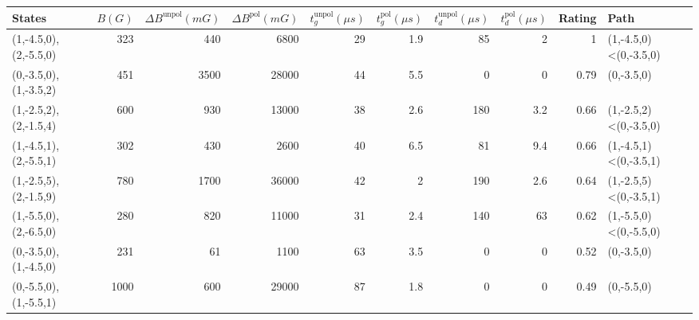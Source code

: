 \begin{tabular}{lrrrrrrrrl}
\hline
 {States}              &   {$B(G)$} &   {$\Delta B^{\text{unpol}}(mG)$} &   {$\Delta B^{\text{pol}}(mG)$} &   {$t^{\text{unpol}}_{g}(\mu s)$} &   {$t^{\text{pol}}_{g}(\mu s)$} &   {$t^{\text{unpol}}_{d}(\mu s)$} &   {$t^{\text{pol}}_{d}(\mu s)$} &   {Rating} & {Path}                \\
\hline
 (1,-4.5,0),(2,-5.5,0) &        323 &                               440 &                            6800 &                                29 &                             1.9 &                                85 &                             2   &       1    & (1,-4.5,0)<(0,-3.5,0) \\
 (0,-3.5,0),(1,-3.5,2) &        451 &                              3500 &                           28000 &                                44 &                             5.5 &                                 0 &                             0   &       0.79 & (0,-3.5,0)            \\
 (1,-2.5,2),(2,-1.5,4) &        600 &                               930 &                           13000 &                                38 &                             2.6 &                               180 &                             3.2 &       0.66 & (1,-2.5,2)<(0,-3.5,0) \\
 (1,-4.5,1),(2,-5.5,1) &        302 &                               430 &                            2600 &                                40 &                             6.5 &                                81 &                             9.4 &       0.66 & (1,-4.5,1)<(0,-3.5,1) \\
 (1,-2.5,5),(2,-1.5,9) &        780 &                              1700 &                           36000 &                                42 &                             2   &                               190 &                             2.6 &       0.64 & (1,-2.5,5)<(0,-3.5,1) \\
 (1,-5.5,0),(2,-6.5,0) &        280 &                               820 &                           11000 &                                31 &                             2.4 &                               140 &                            63   &       0.62 & (1,-5.5,0)<(0,-5.5,0) \\
 (0,-3.5,0),(1,-4.5,0) &        231 &                                61 &                            1100 &                                63 &                             3.5 &                                 0 &                             0   &       0.52 & (0,-3.5,0)            \\
 (0,-5.5,0),(1,-5.5,1) &       1000 &                               600 &                           29000 &                                87 &                             1.8 &                                 0 &                             0   &       0.49 & (0,-5.5,0)            \\
\hline
\end{tabular}
